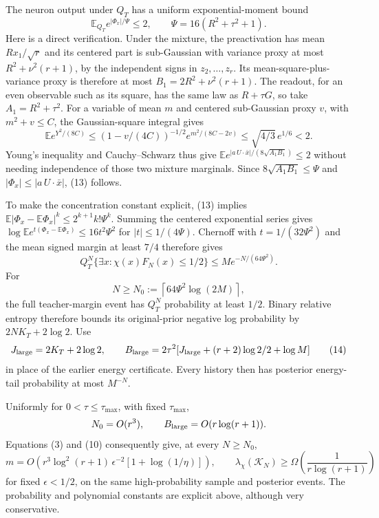 \documentclass[11pt]{article}
\newcommand{\E}{\mathbb E}\newcommand{\R}{\mathbb R}
\begin{document}
The neuron output under $Q_T$ has a uniform exponential-moment bound
\[
 \E_{Q_T}e^{|\Phi_x|/\Psi}\le2,
                 \qquad \Psi=16(R^2+\tau^2+1).           \tag{13}
\]
Here is a direct verification. Under the mixture, the preactivation has
mean $Rx_1/\sqrt r$ and its centered part is sub-Gaussian with variance
proxy at most $R^2+\nu^2(r+1)$, by the independent signs in $z_2,\ldots,z_r$.
Its mean-square-plus-variance proxy is therefore at most
$B_1=2R^2+\nu^2(r+1)$. The readout, for an even observable such as its
square, has the same law as $R+\tau G$, so take $A_1=R^2+\tau^2$.
For a variable of mean $m$ and centered sub-Gaussian proxy $v$, with
$m^2+v\le C$, the Gaussian-square integral gives
\[
 \E e^{Y^2/(8C)}
 \le(1-v/(4C))^{-1/2}e^{m^2/(8C-2v)}
 \le\sqrt{4/3}\,e^{1/6}<2.
\]
Young's inequality and Cauchy--Schwarz thus give
$\E e^{|a\,U\cdot\bar x|/(8\sqrt{A_1B_1})}\le2$ without needing
independence of those two mixture marginals. Since
$8\sqrt{A_1B_1}\le\Psi$ and $|\Phi_x|\le|a\,U\cdot\bar x|$,
(13) follows.

To make the concentration constant explicit, (13) implies
$\E|\Phi_x-\E\Phi_x|^k\le2^{k+1}k!\Psi^k$. Summing the
centered exponential series gives
$\log\E e^{t(\Phi_x-\E\Phi_x)}\le16t^2\Psi^2$ for
$|t|\le1/(4\Psi)$. Chernoff with $t=1/(32\Psi^2)$ and the
mean signed margin at least $7/4$ therefore gives
\[
 Q_T^N\{\exists x:\chi(x)F_N(x)\le1/2\}
                      \le M e^{-N/(64\Psi^2)}.
\]
For
\[
 N\ge N_0:=\left\lceil64\Psi^2\log(2M)\right\rceil,
\]
the full teacher-margin event has $Q_T^N$ probability at least $1/2$.
Binary relative entropy therefore bounds its original-prior negative log
probability by $2NK_T+2\log2$. Use
\[
 J_{\rm large}=2K_T+2\log2,\qquad
 B_{\rm large}=2\tau^2[J_{\rm large}+(r+2)\log2/2+\log M]  \tag{14}
\]
in place of the earlier energy certificate. Every history then has
posterior energy-tail probability at most $M^{-N}$.

Uniformly for $0<\tau\le\tau_{\max}$, with fixed $\tau_{\max}$,
\[
 N_0=O(r^3),\qquad B_{\rm large}=O(r\log(r+1)).
\]
Equations (3) and (10) consequently give, at every $N\ge N_0$,
\[
 m=O\!\left(r^3\log^2(r+1)\,\epsilon^{-2}
                               [1+\log(1/\eta)]\right),
 \qquad
 \lambda_\chi(\mathcal K_N)\ge\Omega\!\left(\frac1{r\log(r+1)}\right)
                                                               \tag{15}
\]
for fixed $\epsilon<1/2$, on the same high-probability sample and posterior
events. The probability and polynomial constants are explicit above,
although very conservative.
\end{document}
